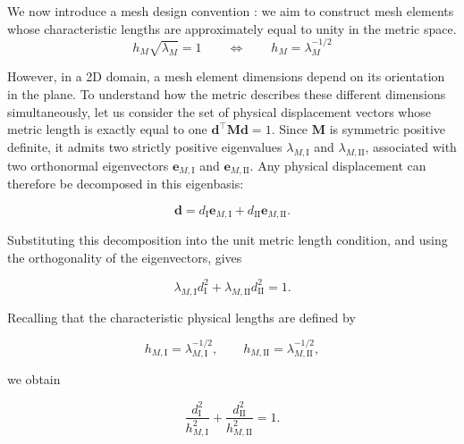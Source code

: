 \documentclass[11pt,a4paper]{article}
\begin{document}
\noindent
We now introduce a mesh design convention : we aim to construct mesh elements whose characteristic lengths are approximately equal to unity in the metric space.
\begin{equation}
  h_M\sqrt{\lambda_M}=1
  \qquad\Longleftrightarrow\qquad
  h_M=\lambda_M^{-1/2}
\end{equation}



\noindent
However, in a 2D domain, a mesh element dimensions 
depend on its orientation in the plane. To understand how the metric describes these different
dimensions simultaneously, let us consider the set of
physical displacement vectors whose metric length is
exactly equal to one $\mathbf{d}^{\top}\mathbf{M}\mathbf{d}=1$.
Since $\mathbf{M}$ is symmetric positive definite,
it admits two strictly positive eigenvalues
$\lambda_{M,\mathrm{I}}$ and $\lambda_{M,\mathrm{II}}$,
associated with two orthonormal eigenvectors
$\mathbf{e}_{M,\mathrm{I}}$ and $\mathbf{e}_{M,\mathrm{II}}$.
Any physical displacement can therefore be decomposed
in this eigenbasis:

\begin{equation}
    \mathbf{d}
    =d_{\mathrm{I}}\mathbf{e}_{M,\mathrm{I}}
    +d_{\mathrm{II}}\mathbf{e}_{M,\mathrm{II}}.
\end{equation}

\noindent
Substituting this decomposition into the unit metric
length condition, and using the orthogonality of the
eigenvectors, gives

\begin{equation}
    \lambda_{M,\mathrm{I}}d_{\mathrm{I}}^2
    +\lambda_{M,\mathrm{II}}d_{\mathrm{II}}^2=1.
\end{equation}

\noindent
Recalling that the characteristic physical lengths
are defined by

\begin{equation}
    h_{M,\mathrm{I}}=\lambda_{M,\mathrm{I}}^{-1/2},
    \qquad
    h_{M,\mathrm{II}}=\lambda_{M,\mathrm{II}}^{-1/2},
\end{equation}

\noindent
we obtain

\begin{equation}
    \boxed{
        \frac{d_{\mathrm{I}}^2}{h_{M,\mathrm{I}}^2}
        +
        \frac{d_{\mathrm{II}}^2}{h_{M,\mathrm{II}}^2}
        =1.
    }
\end{equation}
\end{document}
